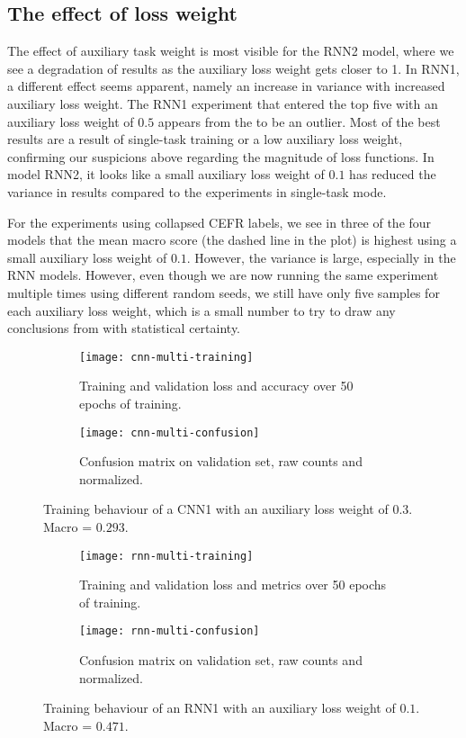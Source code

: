 \subsection{The effect of loss weight}

The effect of auxiliary task weight is most visible for the RNN2 model, where
we see a degradation of results as the auxiliary loss weight gets closer to
1. In RNN1, a different effect seems apparent, namely an increase in variance
with increased auxiliary loss weight. The RNN1 experiment that entered the
top five with an auxiliary loss weight of $0.5$ appears from the to be an
outlier. Most of the best results are a result of single-task training or a
low auxiliary loss weight, confirming our suspicions above regarding the
magnitude of loss functions. In model RNN2, it looks like a small auxiliary
loss weight of $0.1$ has reduced the variance in results compared to the
experiments in single-task mode.

For the experiments using collapsed CEFR labels, we see in three of the four
models that the mean macro \FI score (the dashed line in the plot) is highest
using a small auxiliary loss weight of $0.1$. However, the variance is large,
especially in the RNN models. However, even though we are now running the
same experiment multiple times using different random seeds, we still have
only five samples for each auxiliary loss weight, which is a small number to
try to draw any conclusions from with statistical certainty.

\begin{figure}
  \begin{subfigure}{\linewidth}
    \centering
    \texttt{[image: cnn-multi-training]}
    \caption{Training and validation loss and accuracy over 50 epochs of training.}
  \end{subfigure}
  \begin{subfigure}{\linewidth}
    \centering
    \texttt{[image: cnn-multi-confusion]}
    \caption{Confusion matrix on validation set, raw counts and normalized.}
  \end{subfigure}
  \caption[Training behaviour of a multi-task CNN]{
    Training behaviour of a CNN1 with an auxiliary loss weight of $0.3$.
    Macro \FI = $0.293$.
  }
  \label{fig:cnn-multi-training}
\end{figure}

\begin{figure}
  \begin{subfigure}{\linewidth}
    \centering
    \texttt{[image: rnn-multi-training]}
    \caption{Training and validation loss and metrics over 50 epochs of training.}
  \end{subfigure}
  \begin{subfigure}{\linewidth}
    \centering
    \texttt{[image: rnn-multi-confusion]}
    \caption{Confusion matrix on validation set, raw counts and normalized.}
  \end{subfigure}
  \caption[Training behaviour of a multi-task RNN]{
    Training behaviour of an RNN1 with an auxiliary loss weight of $0.1$.
    Macro \FI = $0.471$.
  }
  \label{fig:rnn-multi-training}
\end{figure}

